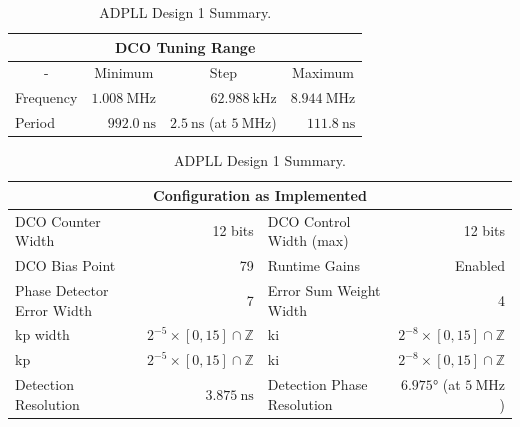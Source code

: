 \begin{table}[!h]
    \begin{center}
        \begin{tabular}{|l|r|r|r|}
            \multicolumn{4}{c}{\ac{DCO} Tuning Range} \T\\
            \hline
            \multicolumn{1}{|c|}{-} & \multicolumn{1}{c|}{Minimum} & \multicolumn{1}{c|}{Step} & \multicolumn{1}{c|}{Maximum} \T\\
            \hline
            Frequency & $1.008~\si{\mega\hertz}$ & \multicolumn{1}{r|}{$62.988~\si{\kilo\hertz}$} & $8.944~\si{\mega\hertz}$ \T\\
            \hline
            Period & $992.0~\si{\nano\second}$ & \multicolumn{1}{r|}{$2.5~\si{\nano\second}$ (at $5~\si{\mega\hertz}$)} & $111.8~\si{\nano\second}$ \T\\
            \hline
        \end{tabular}
        \begin{tabular}{|l|r|l|r|}
            \multicolumn{4}{c}{Configuration as Implemented} \T\\
            \hline
            \ac{DCO} Counter Width & 12 bits & \ac{DCO} Control Width (max) & 12 bits \T\\
            \hline
            \ac{DCO} Bias Point & 79 & Runtime Gains & Enabled \T\\
            \hline
            Phase Detector Error Width & 7 & Error Sum Weight Width & 4 \T\\
            \hline
            \acs{kp} width & $2^{-5}\times[0,15]\cap\mathbb{Z}$ & \acs{ki} & $2^{-8}\times[0,15]\cap\mathbb{Z}$ \T\\
            \acs{kp} & $2^{-5}\times[0,15]\cap\mathbb{Z}$ & \acs{ki} & $2^{-8}\times[0,15]\cap\mathbb{Z}$ \T\\
            \hline
            Detection Resolution & $3.875~\si{\nano\second}$ & Detection Phase Resolution & $6.975\si{\degree}$ (at $5~\si{\mega\hertz}$)\\
            \hline
        \end{tabular}
    \end{center}
\caption[ADPLL Design 1 Summary]{ADPLL Design 1 Summary.}
\label{table:adpll1}
\end{table}

